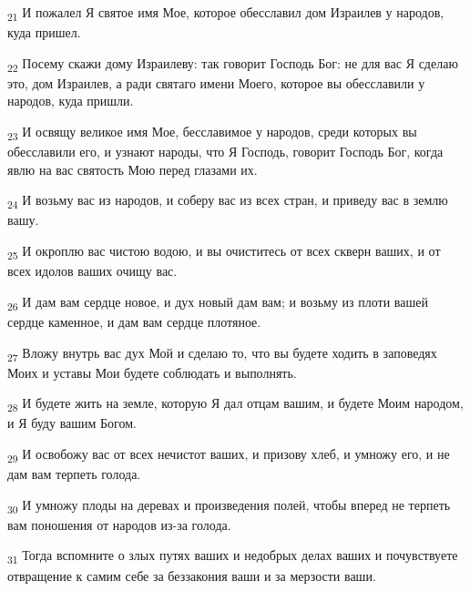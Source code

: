 \begin{tcolorbox}
\textsubscript{21} И пожалел Я святое имя Мое, которое обесславил дом Израилев у народов, куда пришел.
\end{tcolorbox}
\begin{tcolorbox}
\textsubscript{22} Посему скажи дому Израилеву: так говорит Господь Бог: не для вас Я сделаю это, дом Израилев, а ради святаго имени Моего, которое вы обесславили у народов, куда пришли.
\end{tcolorbox}
\begin{tcolorbox}
\textsubscript{23} И освящу великое имя Мое, бесславимое у народов, среди которых вы обесславили его, и узнают народы, что Я Господь, говорит Господь Бог, когда явлю на вас святость Мою перед глазами их.
\end{tcolorbox}
\begin{tcolorbox}
\textsubscript{24} И возьму вас из народов, и соберу вас из всех стран, и приведу вас в землю вашу.
\end{tcolorbox}
\begin{tcolorbox}
\textsubscript{25} И окроплю вас чистою водою, и вы очиститесь от всех скверн ваших, и от всех идолов ваших очищу вас.
\end{tcolorbox}
\begin{tcolorbox}
\textsubscript{26} И дам вам сердце новое, и дух новый дам вам; и возьму из плоти вашей сердце каменное, и дам вам сердце плотяное.
\end{tcolorbox}
\begin{tcolorbox}
\textsubscript{27} Вложу внутрь вас дух Мой и сделаю то, что вы будете ходить в заповедях Моих и уставы Мои будете соблюдать и выполнять.
\end{tcolorbox}
\begin{tcolorbox}
\textsubscript{28} И будете жить на земле, которую Я дал отцам вашим, и будете Моим народом, и Я буду вашим Богом.
\end{tcolorbox}
\begin{tcolorbox}
\textsubscript{29} И освобожу вас от всех нечистот ваших, и призову хлеб, и умножу его, и не дам вам терпеть голода.
\end{tcolorbox}
\begin{tcolorbox}
\textsubscript{30} И умножу плоды на деревах и произведения полей, чтобы вперед не терпеть вам поношения от народов из-за голода.
\end{tcolorbox}
\begin{tcolorbox}
\textsubscript{31} Тогда вспомните о злых путях ваших и недобрых делах ваших и почувствуете отвращение к самим себе за беззакония ваши и за мерзости ваши.
\end{tcolorbox}
